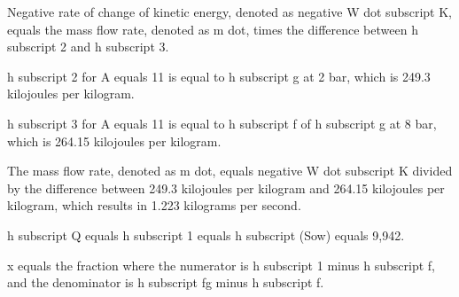 Negative rate of change of kinetic energy, denoted as negative W dot subscript K, equals the mass flow rate, denoted as m dot, times the difference between h subscript 2 and h subscript 3.

h subscript 2 for A equals 11 is equal to h subscript g at 2 bar, which is 249.3 kilojoules per kilogram.

h subscript 3 for A equals 11 is equal to h subscript f of h subscript g at 8 bar, which is 264.15 kilojoules per kilogram.

The mass flow rate, denoted as m dot, equals negative W dot subscript K divided by the difference between 249.3 kilojoules per kilogram and 264.15 kilojoules per kilogram, which results in 1.223 kilograms per second.

h subscript Q equals h subscript 1 equals h subscript (Sow) equals 9,942.

x equals the fraction where the numerator is h subscript 1 minus h subscript f, and the denominator is h subscript fg minus h subscript f.